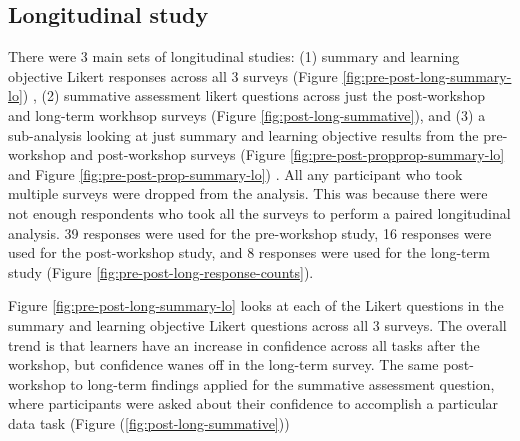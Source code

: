 \documentclass[030-workshop.tex]{subfiles}
\begin{document}
    \subsection{Longitudinal study}

        There were 3 main sets of longitudinal studies:
        (1) summary and learning objective Likert responses across all 3 surveys
        (Figure \ref{fig:pre-post-long-summary-lo})
        ,
        (2) summative assessment likert questions across just the post-workshop and long-term workhsop surveys
        (Figure \ref{fig:post-long-summative}), and
        (3) a sub-analysis looking at just summary and learning objective results from the pre-workshop and post-workshop surveys
        (Figure \ref{fig:pre-post-propprop-summary-lo} and Figure \ref{fig:pre-post-prop-summary-lo})
        .
        All any participant who took multiple surveys were dropped from the analysis.
        This was because there were not enough respondents who took all the surveys to perform a paired longitudinal analysis.
        39 responses were used for the pre-workshop study,
        16 responses were used for the post-workshop study, and
        8 responses were used for the long-term study (Figure \ref{fig:pre-post-long-response-counts}).

        Figure \ref{fig:pre-post-long-summary-lo} looks at each of the Likert questions in the
        summary and learning objective Likert questions across all 3 surveys.
        The overall trend is that learners have an increase in confidence across all tasks after the workshop,
        but confidence wanes off in the long-term survey.
        The same post-workshop to long-term findings applied for the summative assessment question,
        where participants were asked about their confidence to accomplish a particular data task
        (Figure (\ref{fig:post-long-summative}))
\end{document}
